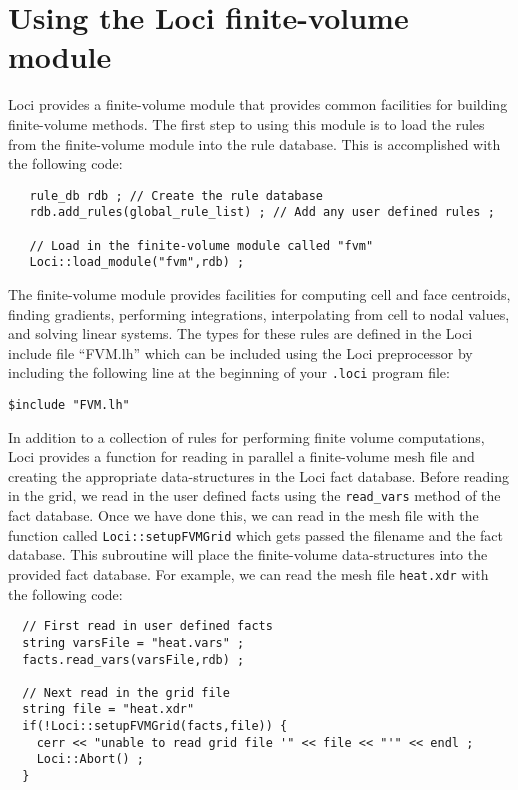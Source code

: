 \documentclass[10pt,epsf,letterpaper,twoside]{book}
\begin{document}
\section{Using the Loci finite-volume module}

Loci provides a finite-volume module that provides common facilities
for building finite-volume methods.  The first step to using this
module is to load the rules from the finite-volume module into the
rule database.  This is accomplished with the following code:
\begin{verbatim}
   rule_db rdb ; // Create the rule database
   rdb.add_rules(global_rule_list) ; // Add any user defined rules ;

   // Load in the finite-volume module called "fvm"
   Loci::load_module("fvm",rdb) ;
\end{verbatim}

The finite-volume module provides facilities for computing cell and
face centroids, finding gradients, performing integrations,
interpolating from cell to nodal values, and solving linear systems.
The types for these rules are defined in the Loci include file
``FVM.lh'' which can be included using the Loci preprocessor by
including the following line at the beginning of your {\tt .loci}
program file:
\begin{verbatim}
$include "FVM.lh"
\end{verbatim}

In addition to a collection of rules for performing finite volume
computations, Loci provides a function for reading in parallel a
finite-volume mesh file and creating the appropriate data-structures
in the Loci fact database.  Before reading in the grid, we read in the
user defined facts using the {\tt read\_vars} method of the fact
database. Once we have done this, we can read in the mesh file with
the function called {\tt Loci::setupFVMGrid} which gets passed the
filename and the fact database.  This subroutine will place the
finite-volume data-structures into the provided fact database.  For
example, we can read the mesh file {\tt heat.xdr} with the following
code:
\begin{verbatim}
  // First read in user defined facts
  string varsFile = "heat.vars" ;
  facts.read_vars(varsFile,rdb) ;

  // Next read in the grid file
  string file = "heat.xdr"
  if(!Loci::setupFVMGrid(facts,file)) {
    cerr << "unable to read grid file '" << file << "'" << endl ;
    Loci::Abort() ;
  }
\end{verbatim}
\end{document}
